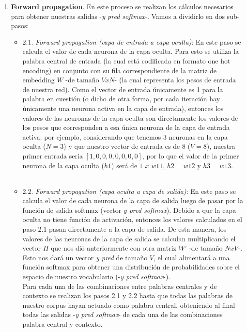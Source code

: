 \documentclass[12pt,a4paper]{article}
\begin{document}
\begin{sloppypar}
\begin{enumerate}
\item \textbf{Forward propagation}. En este proceso se realizan los cálculos necesarios para obtener nuestras salidas -\textit{y pred softmax}-. Vamos a dividirlo en dos sub-pasos:

\begin{itemize}

\item 2.1. \textit{Forward propagation (capa de entrada a capa oculta)}: En este paso se calcula el valor de cada neurona de la capa oculta. Para esto se utiliza la palabra central de entrada (la cual está codificada en formato one hot encoding) en conjunto con su fila correspondiente de la matriz de embedding $W$ -de tamaño $V x N$- (la cual representa los pesos de entrada de nuestra red). Como el vector de entrada únicamente es 1 para la palabra en cuestión (o dicho de otra forma, por cada iteración hay únicamente una neurona activa en la capa de entrada), entonces los valores de las neuronas de la capa oculta son directamente los valores de los pesos que corresponden a esa única neurona de la capa de entrada activa: por ejemplo, considerando que tenemos 3 neuronas en la capa oculta ($N=3$) y que nuestro vector de entrada es de 8 ($V=8$), nuestra primer entrada sería $[1,0,0,0,0,0,0,0]$, por lo que el valor de la primer neurona de la capa oculta ($h1$) será de $1$ $x$ $w11$, $h2 = w12$ y $h3 = w13$.\\ \\

\item 2.2. \textit{Forward propagation (capa oculta a capa de salida)}: En este paso se calcula el valor de cada neurona de la capa de salida luego de pasar por la función de salida softmax (vector \textit{y pred softmax}).  Debido a que la capa oculta no tiene función de activación, entonces los valores calculados en el paso 2.1 pasan directamente a la capa de salida. De esta manera, los valores de las neuronas de la capa de salida se calculan multiplicando el vector $H$ que nos dió anteriormente con otra matriz $W’$ -de tamaño $N x V$-. Esto nos dará un vector \textit{y pred} de tamaño $V$, el cual alimentará a una función softmax para obtener una distribución de probabilidades sobre el espacio de nuestro vocabulario (-\textit{y pred softmax}-). 
\\

Para cada una de las combinaciones entre palabras centrales y de contexto se realizan los pasos 2.1 y 2.2 hasta que todas las palabras de nuestro corpus hayan actuado como palabra central, obteniendo al final todas las salidas -\textit{y pred softmax}- de cada una de las combinaciones palabra central y contexto. 


\end{itemize}
\end{enumerate}
\end{sloppypar}
\end{document}
